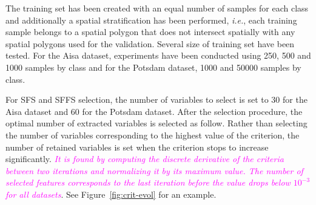 \documentclass[journal,10pt]{IEEEtran}
\newcommand{\rev}[1]{\textcolor{magenta}{\emph{#1}}}
\begin{document}
    The training set has been created  with an equal number of samples
    for each class and additionally  a spatial stratification has been
    performed, \emph{i.e.}, each training  sample belongs to a spatial
    polygon  that  does  not  intersect  spatially  with  any  spatial
    polygons used  for the validation.   Several size of  training set
    have been  tested.  For  the Aisa  dataset, experiments  have been
    conducted using  250, 500 and  1000 samples  by class and  for the
    Potsdam dataset, 1000 and 50000 samples by class.

    For SFS and  SFFS selection, the number of variables  to select is
    set to  30 for the  Aisa dataset and  60 for the  Potsdam dataset.
    After  the selection  procedure, the  optimal number  of extracted
    variables is selected as follow.  Rather than selecting the number
    of variables corresponding to the  highest value of the criterion,
    the number of  retained variables is set when  the criterion stops
    to  increase significantly.   \rev{It  is found  by computing  the
      discrete derivative  of the criteria between  two iterations and
      normalizing it  by its  maximum value.   The number  of selected
      features  corresponds to  the  last iteration  before the  value
      drops    below    $10^{-3}$     for    all    datasets}.     See
    Figure~\ref{fig:crit-evol} for an example.
\end{document}
